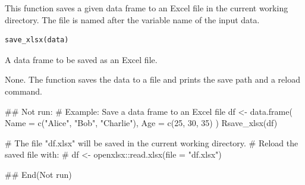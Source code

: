 \documentclass[a4paper]{book}
\begin{document}
%
\begin{Description}
This function saves a given data frame to an Excel file in the current working directory.
The file is named after the variable name of the input data.
\end{Description}
%
\begin{Usage}
\begin{verbatim}
save_xlsx(data)
\end{verbatim}
\end{Usage}
%
\begin{Arguments}
\begin{ldescription}
\item[\code{data}] A data frame to be saved as an Excel file.
\end{ldescription}
\end{Arguments}
%
\begin{Value}
None. The function saves the data to a file and prints the save path and a reload command.
\end{Value}
%
\begin{Examples}
\begin{ExampleCode}
\#\# Not run: 
# Example: Save a data frame to an Excel file
df <- data.frame(
  Name = c("Alice", "Bob", "Charlie"),
  Age = c(25, 30, 35)
)
Rsave_xlsx(df)

# The file "df.xlsx" will be saved in the current working directory.
# Reload the saved file with:
# df <- openxlsx::read.xlsx(file = "df.xlsx")

## End(Not run)
\end{ExampleCode}
\end{Examples}
\end{document}
